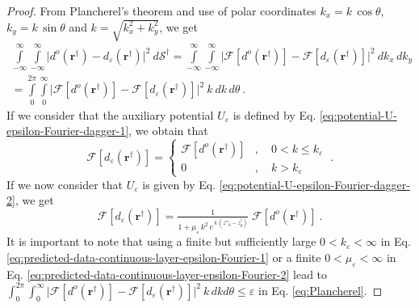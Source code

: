 \begin{proof}
	From Plancherel's theorem \citep[][p. 119]{bracewell1999} and use of polar coordinates 
	$k_{x} = k \, \cos\theta$, $k_{y} = k \, \sin\theta$ and $k = \sqrt{k_{x}^{2} + k_{y}^{2}}$,
	we get
	\begin{equation}
		\begin{split}
			\int\limits_{-\infty}^{\infty} \int\limits_{-\infty}^{\infty}
			\vert 
			d^{o}(\mathbf{r}^{\dagger}) - d_{\varepsilon}(\mathbf{r}^{\dagger})
			\vert^{2} 
			\: d\mathcal{S}^{\dagger} = 
			\int\limits_{-\infty}^{\infty} \int\limits_{-\infty}^{\infty}
			\vert \mathcal{F} [ d^{o}(\mathbf{r}^{\dagger}) ] - \mathcal{F} [
			d_{\varepsilon}(\mathbf{r}^{\dagger}) ] \vert^{2} 
			\: d k_{x} \, d k_{y} \\
			= \int\limits_{0}^{2\pi} \int\limits_{0}^{\infty}
			\vert \mathcal{F} [ d^{o}(\mathbf{r}^{\dagger}) ] - \mathcal{F} [
			d_{\varepsilon}(\mathbf{r}^{\dagger}) ] \vert^{2} \: k \: d k \, d \theta \: .
		\end{split}
		\label{eq:Plancherel}
	\end{equation}
	If we consider that the auxiliary potential $U_{\varepsilon}$ is defined by Eq. \ref{eq:potential-U-epsilon-Fourier-dagger-1},
	we obtain that 
	\begin{equation}
		\mathcal{F} [ d_{\varepsilon}(\mathbf{r}^{\dagger}) ] = 
		\begin{cases}
			\mathcal{F} [ d^{o}(\mathbf{r}^{\dagger}) ] &
			, \quad 0 < k \le k_{\varepsilon} \\
			0 & , \quad k > k_{\varepsilon} 
		\end{cases} \: .
		\label{eq:predicted-data-continuous-layer-epsilon-Fourier-1}
	\end{equation}
	If we now consider that $U_{\varepsilon}$ is given by Eq. \ref{eq:potential-U-epsilon-Fourier-dagger-2},
	we get
	\begin{equation}
		\mathcal{F} [ d_{\varepsilon}(\mathbf{r}^{\dagger}) ] = 
		\tfrac{1}{1 + \mu_{\varepsilon} \, k^{2} \, e^{\, k \, (z''_{0} - z^{\dagger}_{0})}} \; 
		\mathcal{F} [ d^{o}(\mathbf{r}^{\dagger}) ] \: .
		\label{eq:predicted-data-continuous-layer-epsilon-Fourier-2}
	\end{equation}
	It is important to note that using a finite but sufficiently large $0 < k_{\varepsilon} < \infty$ in Eq. 
	\ref{eq:predicted-data-continuous-layer-epsilon-Fourier-1} or a finite $0 < \mu_{\varepsilon} < \infty$ in 
	Eq. \ref{eq:predicted-data-continuous-layer-epsilon-Fourier-2} lead to  
	$\int_{0}^{2\pi} \int_{0}^{\infty} \vert \mathcal{F} [ d^{o}(\mathbf{r}^{\dagger}) ] - \mathcal{F} [d_{\varepsilon}(\mathbf{r}^{\dagger}) ] \vert^{2} \: k \, dkd\theta \le \varepsilon$ in Eq. \ref{eq:Plancherel}. 

\end{proof}
